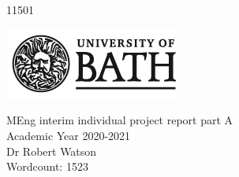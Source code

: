 \begin{titlepage}
	\begin{center}
	\vspace*{2cm}
	\Huge
	\textbf{\thetitle}\\
	\vspace{2cm}
	\LARGE
	\textbf{\theauthor}\\
	11501
	
	\vspace{2cm}
	
	\includegraphics{../figures/uob-logo-black-transparent}
	
	\vspace{3cm}
	
	MEng interim individual project report part A\\
	\vfill
	Academic Year 2020-2021\\
	Dr Robert Watson\\
	
	Wordcount: 1523
	\end{center}
	
\end{titlepage}
